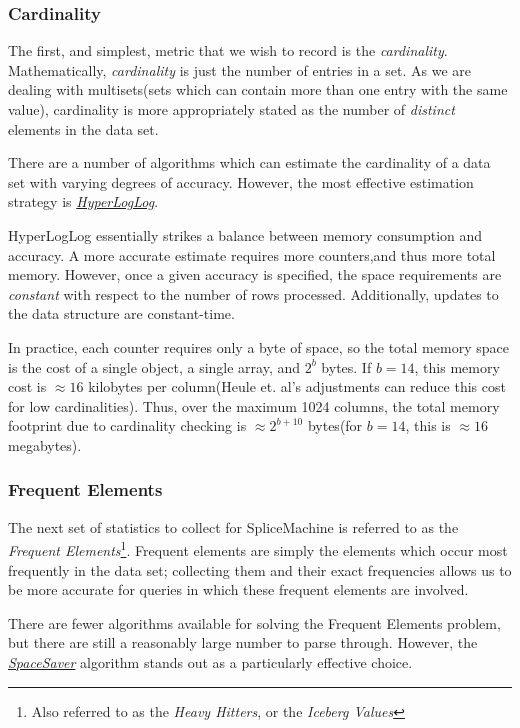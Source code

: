 \subsubsection{Cardinality}
The first, and simplest, metric that we wish to record is the \emph{cardinality}. Mathematically, \emph{cardinality} is just the number of entries in a set. As we are dealing with multisets(sets which can contain more than one entry with the same value), cardinality is more appropriately stated as the number of \emph{distinct} elements in the data set. 

There are a number of algorithms which can estimate the cardinality of a data set with varying degrees of accuracy. However, the most effective estimation strategy is \hyperref[sec:HyperLogLog]{\emph{HyperLogLog}}\cite{Flajolet07hyperloglog:the}. 

HyperLogLog essentially strikes a balance between memory consumption and accuracy. A more accurate estimate requires more counters,and thus more total memory. However, once a given accuracy is specified, the space requirements are \emph{constant} with respect to the number of rows processed. Additionally, updates to the data structure are constant-time. 

In practice, each counter requires only a byte of space, so the total memory space is the cost of a single object, a single array, and $2^b$ bytes. If $b=14$, this memory cost is $\approx 16$ kilobytes per column(Heule et. al's adjustments can reduce this cost for low cardinalities\cite{HyperLogLogGoogle}). Thus, over the maximum 1024 columns, the total memory footprint due to cardinality checking is $\approx 2^{b+10}$ bytes(for $b=14$, this is $\approx 16$ megabytes).

\subsubsection{Frequent Elements}
The next set of statistics to collect for SpliceMachine is referred to as the \emph{Frequent Elements}\footnote{Also referred to as the \emph{Heavy Hitters}, or the \emph{Iceberg Values}}. Frequent elements are simply the elements which occur most frequently in the data set; collecting them and their exact frequencies allows us to be more accurate for queries in which these frequent elements are involved.

There are fewer algorithms available for solving the Frequent Elements problem, but there are still a reasonably large number to parse through. However, the \hyperref[sec:SpaceSaver]{\emph{SpaceSaver}} algorithm stands out as a particularly effective choice.

